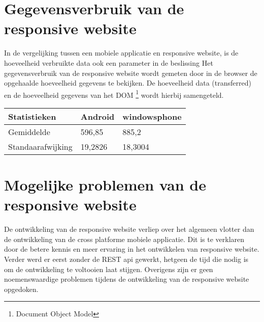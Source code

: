 \section{Gegevensverbruik van de responsive website}
In de vergelijking tussen een mobiele applicatie en responsive website, is de hoeveelheid verbruikte data ook een parameter in de beslissing
Het gegevensverbruik van de responsive website wordt gemeten door in de browser de opgehaalde hoeveelheid gegevens te bekijken.
De hoeveelheid data (transferred) en de hoeveelheid gegevens van het DOM \footnote{Document Object Model} wordt hierbij samengeteld.

\begin{center}
\begin{tabular}{| l | l | l |}
  \hline
  Statistieken & Android & windowsphone \\ \hline
  Gemiddelde & 596,85 & 885,2 \\ \hline
  Standaarafwijking & 19,2826 & 18,3004 \\ \hline
\end{tabular}
\end{center}
\section{Mogelijke problemen van de responsive website}
De ontwikkeling van de responsive website verliep over het algemeen vlotter dan de ontwikkeling van de cross platforme mobiele applicatie.
Dit is te verklaren door de betere kennis en meer ervaring in het ontwikkelen van responsive website.
Verder werd er eerst zonder de REST api gewerkt, hetgeen de tijd die nodig is om de ontwikkeling te voltooien laat stijgen.
Overigens zijn er geen noemenswaardige problemen tijdens de ontwikkeling van de responsive website opgedoken.
